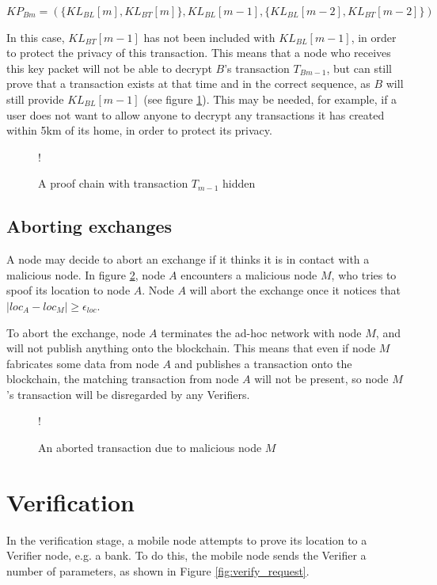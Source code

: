 ${KP_{Bm} = (\{KL_{BL}[m], KL_{BT}[m]\}, KL_{BL}[m-1], \{KL_{BL}[m-2], KL_{BT}[m-2]\})}$

\null
In this case, $KL_{BT}[m-1]$ has not been included with $KL_{BL}[m-1]$, in order to protect the privacy of this transaction. This means that a node who receives this key packet will not be able to decrypt $B$'s transaction $T_{Bm-1}$, but can still prove that a transaction exists at that time and in the correct sequence, as $B$ will still provide $KL_{BL}[m-1]$ (see figure \ref{fig:link}). This may be needed, for example, if a user does not want to allow anyone to decrypt any transactions it has created within 5km of its home, in order to protect its privacy.

\begin{figure}[H]
\begin{center}
\resizebox {\columnwidth} {!} {}
\caption{A proof chain with transaction $T_{m-1}$ hidden}
\label{fig:link}
\end{center}
\end{figure}

\subsection{Aborting exchanges} \label{ssec:aborting_exchanges}
A node may decide to abort an exchange if it thinks it is in contact with a malicious node. In figure \ref{fig:aborted_transaction}, node $A$ encounters a malicious node $M$, who tries to spoof its location to node $A$. Node $A$ will abort the exchange once it notices that $|loc_A-loc_M| \geq \epsilon_{loc}$.

To abort the exchange, node $A$ terminates the ad-hoc network with node $M$, and will not publish anything onto the blockchain. This means that even if node $M$ fabricates some data from node $A$ and publishes a transaction onto the blockchain, the matching transaction from node $A$ will not be present, so node $M$'s transaction will be disregarded by any Verifiers.

\begin{figure}[H]
\resizebox {\columnwidth} {!} {}
\caption{An aborted transaction due to malicious node $M$}
\label{fig:aborted_transaction}
\end{figure}

\clearpage
\section{Verification} \label{ssec:verification}
In the verification stage, a mobile node attempts to prove its location to a Verifier node, e.g. a bank. To do this, the mobile node sends the Verifier a number of parameters, as shown in Figure \ref{fig:verify_request}.

